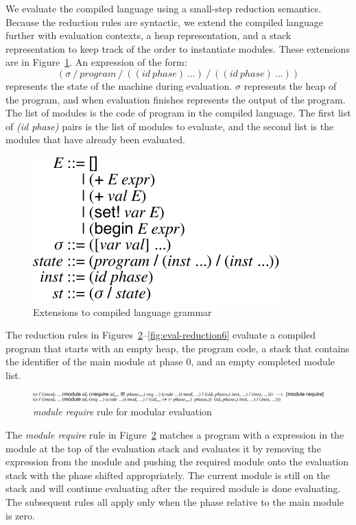 We evaluate the compiled language using a small-step reduction semantics. 
Because the reduction rules are syntactic, we extend the compiled language further with evaluation contexts, a heap representation, and a stack representation to keep track of the order to instantiate modules.
These extensions are in Figure~\ref{fig:compiled-eval-lang}.
An expression of the form:
\[
  (\sigma\ /\ program\ /\ ((id\ phase)\ \ldots)\ /\ ((id\ phase)\ \ldots))
\]
represents the state of the machine during evaluation.
$\sigma$ represents the heap of the program, and when evaluation finishes represents the output of the program.
The list of modules is the code of program in the compiled language.
The first list of \emph{(id phase)} pairs is the list of modules to evaluate, and the second list is the modules that have already been evaluated.

\begin{figure}[h]
\centering
\includegraphics{figures/compiled-eval-lang}
\caption{Extensions to compiled language grammar}
\label{fig:compiled-eval-lang}
\end{figure}

The reduction rules in Figures~\ref{fig:eval-reduction0}--\ref{fig:eval-reduction6} evaluate a compiled program that starts with an empty heap, the program code, a stack that contains the identifier of the main module at phase 0, and an empty completed module list. 

\begin{figure}[!h]
  \includegraphics[width=\textwidth]{figures/eval-reduction0}
\caption{\emph{module require} rule for modular evaluation}
\label{fig:eval-reduction0}
\end{figure}
The \emph{module require} rule in Figure~\ref{fig:eval-reduction0} matches a program with a  expression in the module at the top of the evaluation stack and evaluates it by removing the  expression from the module and pushing the required module onto the evaluation stack with the phase shifted appropriately.
The current module is still on the stack and will continue evaluating after the required module is done evaluating.
The subsequent rules all apply only when the phase relative to the main module is zero.

